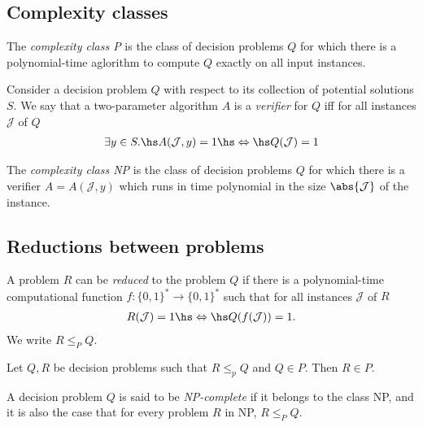 \documentclass{article}
\begin{document}
\subsection{Complexity classes}

\begin{definition}
	The \emph{complexity class P} is the class of decision problems
	$Q$ for which there is a polynomial-time aglorithm to compute $Q$
	exactly on all input instances.
\end{definition}

\begin{definition}
	Consider a decision problem $Q$ with respect to its collection
	of potential solutions $S$. We say that a two-parameter algorithm 
	$A$ is a \emph{verifier} for $Q$ iff for all instances
	$\mathcal{J}$ of $Q$
	\begin{align*}
		\exists y\in S.\hs A(\mathcal{J},y)=1\hs\Leftrightarrow\hs Q(\mathcal{J})=1
	\end{align*}
\end{definition}

\begin{definition}
	The \emph{complexity class NP} is the class of decision problems $Q$
	for which there is a verifier $A=A(\mathcal{J}, y)$ which runs in time
	polynomial in the size $\abs{\mathcal{J}}$ of the instance.
\end{definition}

\subsection{Reductions between problems}

\begin{definition}
	A problem $R$ can be \emph{reduced} to the problem $Q$ if there
	is a polynomial-time computational function $f:\{0,1\}^*\to\{0,1\}^*$
	such that for all instances $\mathcal{J}$ of $R$
	\begin{align*}
		R(\mathcal{J})=1 \hs\Leftrightarrow\hs Q(f(\mathcal{J}))=1.
	\end{align*}
	We write $R\leq_P Q$.
\end{definition}

\begin{theorem}
	Let $Q,R$ be decision problems such that $R\leq_p Q$ and
	$Q\in P$. Then $R\in P$.
\end{theorem}

\begin{definition}
	A decision problem $Q$ is said to be \emph{NP-complete} if it
	belongs to the class NP, and it is also the case that for every
	problem $R$ in NP, $R\leq_P Q$.
\end{definition}
\end{document}
